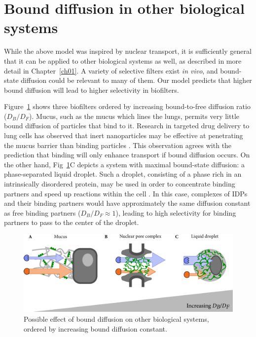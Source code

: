 \section{Bound diffusion in other biological systems}
\label{sec:other-filters}

While the above model was inspired by nuclear transport, it is sufficiently general that it can be applied to other biological systems as well, as described in more detail in Chapter~\ref{ch01}.  A variety of selective filters exist \textit{in vivo}, and bound-state diffusion could be relevant to many of them.  Our model predicts that higher bound diffusion will lead to higher selectivity in biofilters.  

Figure~\ref{fig:other-filters} shows three biofilters ordered by increasing bound-to-free diffusion ratio ($D_B/D_F$).  Mucus, such as the mucus which lines the lungs, permits very little bound diffusion of particles that bind to it.  Research in targeted drug delivery to lung cells has observed that inert nanoparticles may be effective at penetrating the mucus barrier than binding particles \cite{witten17}.  This observation agrees with the prediction that binding will only enhance transport if bound diffusion occurs.   On the other hand, Fig~\ref{fig:other-filters}C depicts a system with maximal bound-state diffusion: a phase-separated liquid droplet.  Such a droplet, consisting of a phase rich in an intrinsically disordered protein, may be used in order to concentrate binding partners and speed up reactions within the cell \cite{brangwynne15, feric16}.  In this case, complexes of IDPs and their binding partners would have approximately the same diffusion constant as free binding partners ($D_B/D_F \approx 1$), leading to high selectivity for binding partners to pass to the center of the droplet.

\begin{figure}
\centering
\includegraphics[width=0.8\linewidth]{figs/ch02/concluding-cartoon-large.pdf}
\caption[Bound diffusion in other systems.]{Possible effect of bound diffusion on other biological systems, ordered by increasing bound diffusion constant.}
\label{fig:other-filters}
\end{figure}

